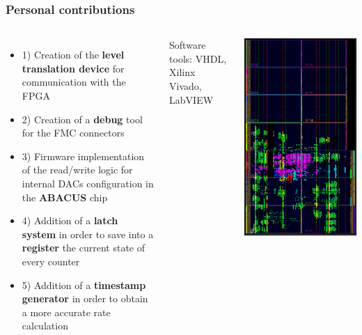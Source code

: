 \documentclass[aspectratio=169]{beamer}
\begin{document}
	
	\begin{frame}
	\frametitle{Personal contributions}
	\begin{columns}
		\begin{itemize}
			\item 1) {\color{teal} Creation of the \textbf{level translation device} for communication with the FPGA}
			\item 2) {\color{teal} Creation of a \textbf{debug} tool for the FMC connectors}
			\item 3) {\color{teal} Firmware implementation of the read/write logic for internal DACs configuration in the \textbf{ABACUS} chip}
			\item 4) {\color{teal} Addition of a \textbf{latch system} in order to save into a \textbf{register} the current state of every counter}
			\item 5) {\color{teal} Addition of a \textbf{timestamp generator} in order to obtain a more accurate rate calculation}
		\end{itemize}
		Software tools: VHDL, Xilinx Vivado, LabVIEW
		\begin{center}
			\includegraphics[width=0.67 \textwidth]{IMG2/DEVICE.PNG}
		\end{center}
	\end{columns}
	
	\end{frame}
	
\end{document}
